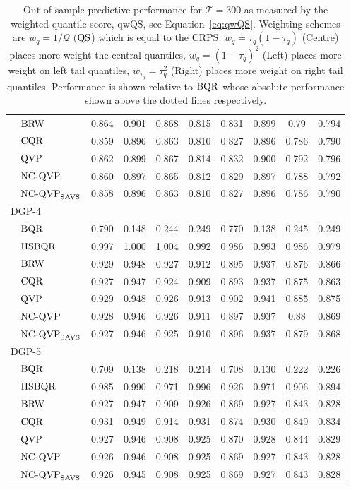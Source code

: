 \begin{table}[H]
{\begin{tabular}{ll|cccc|cccc}
 & $\operatorname{BRW}$   & 0.864 & 0.901 & 0.868 & 0.815 & 0.831 & 0.899 & 0.79 & 0.794 \\
 & $\operatorname{CQR}$   & 0.859 & 0.896 & 0.863 & 0.810 & 0.827 & 0.896 & 0.786 & 0.790 \\
 & $\operatorname{QVP}$   & 0.862 & 0.899 & 0.867 & 0.814 & 0.832 & 0.900 & 0.792 & 0.796 \\
 & $\operatorname{NC-QVP}$ & 0.860 & 0.897 & 0.865 & 0.812 & 0.829 & 0.897 & 0.788 & 0.792 \\
 & $\operatorname{NC-QVP}_{\mathrm{SAVS}}$ & 0.858 & 0.896 & 0.863 & 0.810 & 0.827 & 0.896 & 0.786 & 0.790 \\ \hline
\multicolumn{2}{l|}{$\mathrm{DGP}$-4} &  &  &  &  &  &  \\
 & $\operatorname{BQR}$   & 0.790 & 0.148 & 0.244 & 0.249 & 0.770 & 0.138 & 0.245 & 0.249 \\ \hdashline
 & $\operatorname{HSBQR}$ & 0.997 & 1.000 & 1.004 & 0.992 & 0.986 & 0.993 & 0.986 & 0.979 \\
 & $\operatorname{BRW}$   & 0.929 & 0.948 & 0.927 & 0.912 & 0.895 & 0.937 & 0.876 & 0.866 \\
 & $\operatorname{CQR}$   & 0.927 & 0.947 & 0.924 & 0.909 & 0.893 & 0.937 & 0.875 & 0.863 \\
 & $\operatorname{QVP}$   & 0.929 & 0.948 & 0.926 & 0.913 & 0.902 & 0.941 & 0.885 & 0.875 \\
 & $\operatorname{NC-QVP}$ & 0.928 & 0.946 & 0.926 & 0.911 & 0.897 & 0.937 & 0.88 & 0.869 \\
 & $\operatorname{NC-QVP}_{\mathrm{SAVS}}$ & 0.927 & 0.946 & 0.925 & 0.910 & 0.896 & 0.937 & 0.879 & 0.868 \\ \hline
\multicolumn{2}{l|}{$\mathrm{DGP}$-5} &  &  &  &  &  &  \\
 & $\operatorname{BQR}$   & 0.709 & 0.138 & 0.218 & 0.214 & 0.708 & 0.130 & 0.222 & 0.226 \\ \hdashline
 & $\operatorname{HSBQR}$ & 0.985 & 0.990 & 0.971 & 0.996 & 0.926 & 0.971 & 0.906 & 0.894 \\
 & $\operatorname{BRW}$   & 0.927 & 0.947 & 0.909 & 0.926 & 0.869 & 0.927 & 0.843 & 0.828 \\
 & $\operatorname{CQR}$   & 0.931 & 0.949 & 0.914 & 0.931 & 0.874 & 0.930 & 0.849 & 0.834 \\
 & $\operatorname{QVP}$   & 0.927 & 0.946 & 0.908 & 0.925 & 0.870 & 0.928 & 0.844 & 0.829 \\
 & $\operatorname{NC-QVP}$ & 0.926 & 0.946 & 0.908 & 0.925 & 0.869 & 0.927 & 0.843 & 0.828 \\
 & $\operatorname{NC-QVP}_{\mathrm{SAVS}}$ & 0.926 & 0.945 & 0.908 & 0.925 & 0.869 & 0.927 & 0.843 & 0.828 \\ \hline
\end{tabular}%
}
\caption{Out-of-sample predictive performance for $\mathcal{T}=300$ as measured by the weighted quantile score, $\mathrm{qwQS}$, see Equation~\ref{eq:qwQS}. Weighting schemes are $w_{q} = 1/\mathcal{Q}$ ($\operatorname{QS}$) which is equal to the $\mathrm{CRPS}$. $w_{q} = \tau_q(1-\tau_q)$ (Centre) places more weight the central quantiles, $w_{q} = (1-\tau_q)^2$ (Left) places more weight on left tail quantiles, $w_{\tau_q} = \tau^2_q$ (Right) places more weight on right tail quantiles. Performance is shown relative to $\operatorname{BQR}$ whose absolute performance shown above the dotted lines respectively.}
\label{tab:overallbias_quant}
\end{table}

